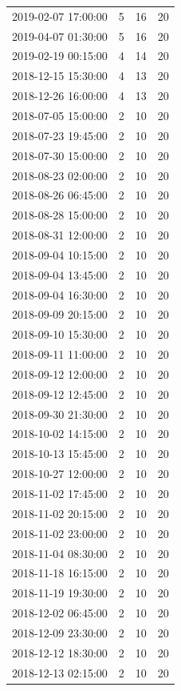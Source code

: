 \begin{tabular}{lrrr}
2019-02-07 17:00:00 & 5 & 16 & 20 \\
2019-04-07 01:30:00 & 5 & 16 & 20 \\
2019-02-19 00:15:00 & 4 & 14 & 20 \\
2018-12-15 15:30:00 & 4 & 13 & 20 \\
2018-12-26 16:00:00 & 4 & 13 & 20 \\
2018-07-05 15:00:00 & 2 & 10 & 20 \\
2018-07-23 19:45:00 & 2 & 10 & 20 \\
2018-07-30 15:00:00 & 2 & 10 & 20 \\
2018-08-23 02:00:00 & 2 & 10 & 20 \\
2018-08-26 06:45:00 & 2 & 10 & 20 \\
2018-08-28 15:00:00 & 2 & 10 & 20 \\
2018-08-31 12:00:00 & 2 & 10 & 20 \\
2018-09-04 10:15:00 & 2 & 10 & 20 \\
2018-09-04 13:45:00 & 2 & 10 & 20 \\
2018-09-04 16:30:00 & 2 & 10 & 20 \\
2018-09-09 20:15:00 & 2 & 10 & 20 \\
2018-09-10 15:30:00 & 2 & 10 & 20 \\
2018-09-11 11:00:00 & 2 & 10 & 20 \\
2018-09-12 12:00:00 & 2 & 10 & 20 \\
2018-09-12 12:45:00 & 2 & 10 & 20 \\
2018-09-30 21:30:00 & 2 & 10 & 20 \\
2018-10-02 14:15:00 & 2 & 10 & 20 \\
2018-10-13 15:45:00 & 2 & 10 & 20 \\
2018-10-27 12:00:00 & 2 & 10 & 20 \\
2018-11-02 17:45:00 & 2 & 10 & 20 \\
2018-11-02 20:15:00 & 2 & 10 & 20 \\
2018-11-02 23:00:00 & 2 & 10 & 20 \\
2018-11-04 08:30:00 & 2 & 10 & 20 \\
2018-11-18 16:15:00 & 2 & 10 & 20 \\
2018-11-19 19:30:00 & 2 & 10 & 20 \\
2018-12-02 06:45:00 & 2 & 10 & 20 \\
2018-12-09 23:30:00 & 2 & 10 & 20 \\
2018-12-12 18:30:00 & 2 & 10 & 20 \\
2018-12-13 02:15:00 & 2 & 10 & 20 \\

\end{tabular}

